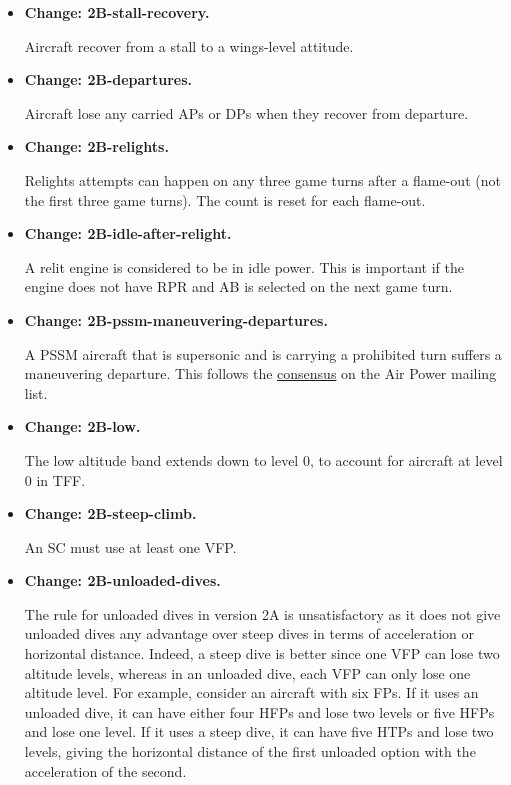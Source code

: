 \documentclass{report}
\newcommand{\changetag}[1]{\textbf{Change: #1.}\par}
\begin{document}
\begin{itemize}
        For purposes other than turns or maneuvers, an aircraft is supersonic if its speed is greater than or equal to the M1 speed in the altitude band in which it started the game turn.

    \item\changetag{2B-stall-recovery}

        Aircraft recover from a stall to a wings-level attitude.

    \item\changetag{2B-departures}

        Aircraft lose any carried APs or DPs when they recover from departure.

    \item\changetag{2B-relights}

        Relights attempts can happen on any three game turns after a flame-out (not the first three game turns). The count is reset for each flame-out.

    \item\changetag{2B-idle-after-relight}

        A relit engine is considered to be in idle power. This is important if the engine does not have RPR and AB is selected on the next game turn.

    \item\changetag{2B-pssm-maneuvering-departures}

        A PSSM aircraft that is supersonic and is carrying a prohibited turn suffers a maneuvering departure. This follows the \href{https://airpower.groups.io/g/main/message/2519}{consensus} on the Air Power mailing list.

    \item\changetag{2B-low}

        The low altitude band extends down to level 0, to account for aircraft at level 0 in TFF.

    \item\changetag{2B-steep-climb}

        An SC must use at least one VFP.

    \item\changetag{2B-unloaded-dives}

        The rule for unloaded dives in version 2A is unsatisfactory as it does not give unloaded dives any advantage over steep dives in terms of acceleration or horizontal distance. Indeed, a steep dive is better since one VFP can lose two altitude levels, whereas in an unloaded dive, each VFP can only lose one altitude level. For example, consider an aircraft with six FPs. If it uses an unloaded dive, it can have either four HFPs and lose two levels or five HFPs and lose one level. If it uses a steep dive, it can have five HTPs and lose two levels, giving the horizontal distance of the first unloaded option with the acceleration of the second.


\end{itemize}
\end{document}
